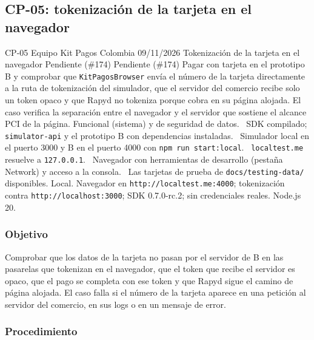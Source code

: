 \subsection{CP-05: tokenización de la tarjeta en el navegador}
\label{anexo:cp05}

\FichaCaso
  {CP-05}
  {Equipo Kit Pagos Colombia}
  {09/11/2026}
  {Tokenización de la tarjeta en el navegador}
  {Pendiente (\#174)}
  {Pendiente (\#174)}
  {Pagar con tarjeta en el prototipo B y comprobar que \texttt{KitPagosBrowser} envía el número de la tarjeta directamente a la ruta de tokenización del simulador, que el servidor del comercio recibe solo un token opaco y que Rapyd no tokeniza porque cobra en su página alojada. El caso verifica la separación entre el navegador y el servidor que sostiene el alcance PCI de la página.}
  {Funcional (sistema) y de seguridad de datos.}
  {\textbullet\ SDK compilado; \texttt{simulator-api} y el prototipo B con dependencias instaladas.\newline
   \textbullet\ Simulador local en el puerto 3000 y B en el puerto 4000 con \texttt{npm run start:local}.\newline
   \textbullet\ \texttt{localtest.me} resuelve a \texttt{127.0.0.1}.\newline
   \textbullet\ Navegador con herramientas de desarrollo (pestaña Network) y acceso a la consola.\newline
   \textbullet\ Las tarjetas de prueba de \texttt{docs/testing-data/} disponibles.}
  {Local. Navegador en \texttt{http://localtest.me:4000}; tokenización contra \texttt{http://localhost:3000}; SDK 0.7.0-rc.2; sin credenciales reales. Node.js 20.}

\subsubsection{Objetivo}

Comprobar que los datos de la tarjeta no pasan por el servidor de B en las pasarelas que tokenizan en el navegador, que el token que recibe el servidor es opaco, que el pago se completa con ese token y que Rapyd sigue el camino de página alojada. El caso falla si el número de la tarjeta aparece en una petición al servidor del comercio, en sus logs o en un mensaje de error.

\subsubsection{Procedimiento}

